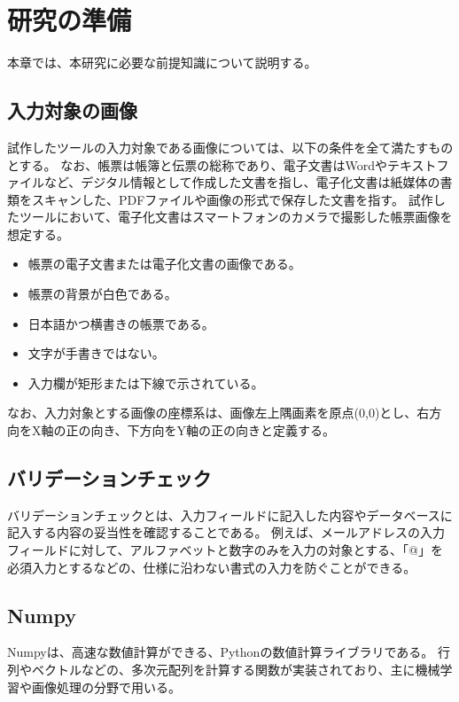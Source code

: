 \chapter{研究の準備}\label{cha:Preparation}
本章では、本研究に必要な前提知識について説明する。

\section{入力対象の画像}\label{sec:input_images}
試作したツールの入力対象である画像については、以下の条件を全て満たすものとする。
なお、帳票は帳簿と伝票の総称であり、電子文書はWordやテキストファイルなど、デジタル情報として作成した文書を指し、電子化文書は紙媒体の書類をスキャンした、PDFファイルや画像の形式で保存した文書を指す\cite{電子文書と電子化文書}。
試作したツールにおいて、電子化文書はスマートフォンのカメラで撮影した帳票画像を想定する。

\begin{itemize}
	\item 帳票の電子文書または電子化文書の画像である。
	\item 帳票の背景が白色である。
	\item 日本語かつ横書きの帳票である。
	\item 文字が手書きではない。
	\item 入力欄が矩形または下線で示されている。
\end{itemize}

なお、入力対象とする画像の座標系は、画像左上隅画素を原点(0,0)とし、右方向をX軸の正の向き、下方向をY軸の正の向きと定義する。

\section{バリデーションチェック}\label{sec:validation_check}
バリデーションチェックとは、入力フィールドに記入した内容やデータベースに記入する内容の妥当性を確認することである\cite{バリデーションチェック}。
例えば、メールアドレスの入力フィールドに対して、アルファベットと数字のみを入力の対象とする、「@」を必須入力とするなどの、仕様に沿わない書式の入力を防ぐことができる。

\section{Numpy}\label{sec:Numpy}
Numpyは、高速な数値計算ができる、Python\cite{Python}の数値計算ライブラリである\cite{Numpy}。
行列やベクトルなどの、多次元配列を計算する関数が実装されており、主に機械学習や画像処理の分野で用いる。

